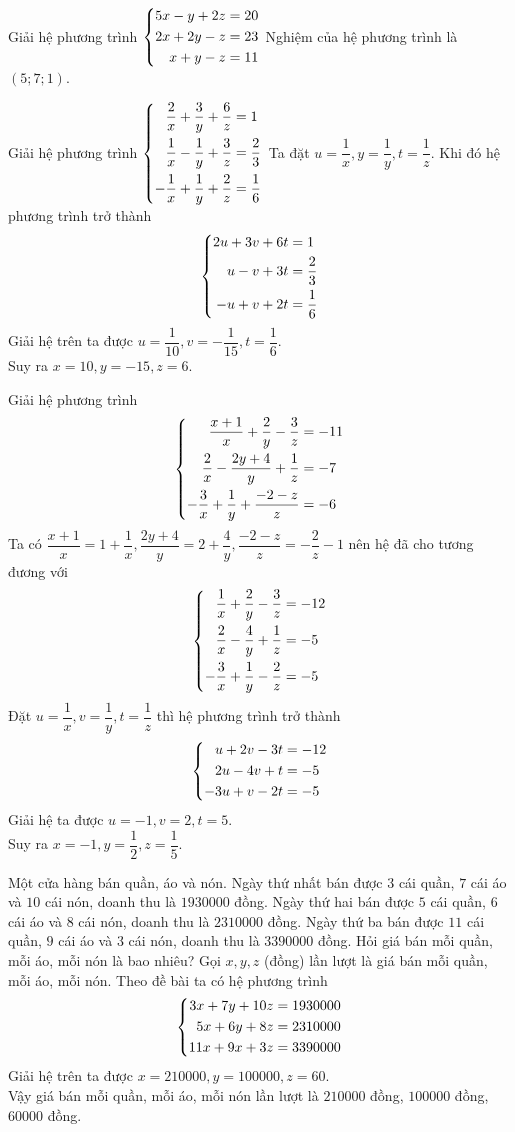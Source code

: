 \begin{bt}%
Giải hệ phương trình $\left\{\begin{aligned}5x-y+2z&=20\\2x+2y-z&=23\\x+y-z&=11\end{aligned}\right.$
\loigiai
{Nghiệm của hệ phương trình là $(5;7;1)$.}
\end{bt}

\begin{bt}%
Giải hệ phương trình $\left\{\begin{aligned}\dfrac{2}{x}+\dfrac{3}{y}+\dfrac{6}{z}&=1\\\dfrac{1}{x}-\dfrac{1}{y}+\dfrac{3}{z}&=\dfrac{2}{3}\\-\dfrac{1}{x}+\dfrac{1}{y}+\dfrac{2}{z}&=\dfrac{1}{6}\end{aligned}\right.$
\loigiai
{Ta đặt $u=\dfrac{1}{x}, y=\dfrac{1}{y}, t=\dfrac{1}{z}$. Khi đó hệ phương trình trở thành
\[ \left\{\begin{aligned}2u+3v+6t&=1\\u-v+3t&=\dfrac{2}{3}\\-u+v+2t&=\dfrac{1}{6}\end{aligned}\right.\]
Giải hệ trên ta được $u=\dfrac{1}{10}, v=-\dfrac{1}{15}, t=\dfrac{1}{6}$.\\
Suy ra $x=10, y=-15, z=6$.}
\end{bt}

\begin{bt}%
Giải hệ phương trình \[ \left\{\begin{aligned}\dfrac{x+1}{x}+\dfrac{2}{y}-\dfrac{3}{z}&=-11\\\dfrac{2}{x}-\dfrac{2y+4}{y}+\dfrac{1}{z}&=-7\\-\dfrac{3}{x}+\dfrac{1}{y}+\dfrac{-2-z}{z}&=-6\end{aligned}\right.\]
\loigiai
{Ta có $\dfrac{x+1}{x}=1+\dfrac{1}{x}, \dfrac{2y+4}{y}=2+\dfrac{4}{y}, \dfrac{-2-z}{z}=-\dfrac{2}{z}-1$ nên hệ đã cho tương đương với
\[  \left\{\begin{aligned}\dfrac{1}{x}+\dfrac{2}{y}-\dfrac{3}{z}&=-12\\\dfrac{2}{x}-\dfrac{4}{y}+\dfrac{1}{z}&=-5\\-\dfrac{3}{x}+\dfrac{1}{y}-\dfrac{2}{z}&=-5\end{aligned}\right.\]
Đặt $u=\dfrac{1}{x}, v=\dfrac{1}{y}, t=\dfrac{1}{z}$ thì hệ phương trình trở thành
\[ \left\{\begin{aligned}u+2v-3t&=-12\\2u-4v+t&=-5\\-3u+v-2t&=-5\end{aligned}\right.\]
Giải hệ ta được $u=-1, v=2, t=5$.\\
Suy ra $x=-1, y=\dfrac{1}{2}, z=\dfrac{1}{5}$.
}
\end{bt}

\begin{bt}%
Một cửa hàng bán quần, áo và nón. Ngày thứ nhất bán được $3$ cái quần, $7$ cái áo và $10$ cái nón, doanh thu là $1930000$ đồng. Ngày thứ hai bán được $5$ cái quần, $6$ cái áo và $8$ cái nón, doanh thu là $2310000$ đồng. Ngày thứ ba bán được $11$ cái quần, $9$ cái áo và $3$ cái nón, doanh thu là $3390000$ đồng. Hỏi giá bán mỗi quần, mỗi áo, mỗi nón là bao nhiêu?
\loigiai
{Gọi $x, y, z$ (đồng) lần lượt là giá bán mỗi quần, mỗi áo, mỗi nón.
Theo đề bài ta có hệ phương trình
\[ \left\{\begin{aligned}3x+7y+10z&=1930000\\5x+6y+8z&=2310000\\11x+9x+3z&=3390000\end{aligned}\right. \]
Giải hệ trên ta được $x=210000, y=100000, z=60$.\\
Vậy giá bán mỗi quần, mỗi áo, mỗi nón lần lượt là $210000$ đồng, $100000$ đồng, $60000$ đồng.}
\end{bt}

